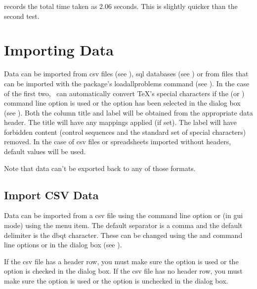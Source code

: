    records the total time taken as 2.06 seconds.
  This is slightly quicker than the second  test.


\chapter{Importing Data}\label{sec:import}

   Data can be imported from \gls{csv} files (see 
   ), \gls{sql} databases (see 
   ) or from files that can be imported with 
   the  package's \gls{loadallproblems} command
   (see ). In the case of the first
   two, \appname\ can automatically convert \TeX's special characters if the
    (or ) command line option is used or the
    option has been selected in the 
    dialog box (see ).
   Both the column title and label will be obtained from the appropriate data 
   header.  The title will have any mappings applied (if set). The label will 
   have forbidden content (control sequences and the standard set of special 
   characters) removed. In the case of \gls{csv} files or spreadsheets
   imported without headers, default values will be used.


   Note that data can't be exported back to any of those formats.


\section{Import CSV Data}\label{sec:importcsv}

   Data can be imported from a \gls{csv} file using
   the  command line option or (in \gls{gui} mode)
   using the  menu item. The default
   separator is a \gls{comma} and the default delimiter is the \gls{dbqt}
   character. These can be changed using the  and 
    command line options or in the 
    dialog box (see ).

   If the \gls{csv} file has a header row, you must make sure 
   the  option is used or the 
    option is checked in the
    dialog box.
   If the \gls{csv} file has no header row, you must make sure 
   the  option is used or the 
    option is unchecked in the
    dialog box.



